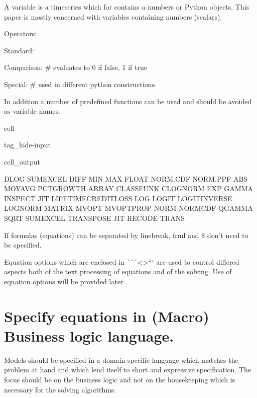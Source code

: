\documentclass[letterpaper,10pt,english]{jupyterBook}
\begin{document}
\sphinxAtStartPar
A variable is a timeseries which for contains a numbers or Python objects. This paper is mostly concerned with variables containing numbers (scalars).

\sphinxAtStartPar
Operators:

\sphinxAtStartPar
Standard: 

\sphinxAtStartPar
Comparison: \sphinxcode{\sphinxupquote{>= <= == !=}}  \# evaluates to 0 if false, 1 if true

\sphinxAtStartPar
Special:  \# used in different python constructions.

\sphinxAtStartPar
In addition a number of pre\sphinxhyphen{}defined functions can be used and should be avoided as variable names.

\begin{sphinxuseclass}{cell}
\begin{sphinxuseclass}{tag_hide-input}\begin{sphinxVerbatimOutput}

\begin{sphinxuseclass}{cell_output}
\begin{sphinxVerbatim}[commandchars=\\\{\}]
DLOG SUM\PYGZus{}EXCEL DIFF MIN MAX FLOAT NORM.CDF NORM.PPF ABS MOVAVG PCT\PYGZus{}GROWTH ARRAY CLASSFUNK CLOGNORM EXP GAMMA INSPECT JIT LIFETIME\PYGZus{}CREDIT\PYGZus{}LOSS LOG LOGIT LOGIT\PYGZus{}INVERSE LOGNORM MATRIX MV\PYGZus{}OPT MV\PYGZus{}OPT\PYGZus{}PROP NORM NORMCDF QGAMMA SQRT SUM\PYGZus{}EXCEL TRANSPOSE JIT RECODE TRANS
\end{sphinxVerbatim}

\end{sphinxuseclass}\end{sphinxVerbatimOutput}

\end{sphinxuseclass}
\end{sphinxuseclass}
\sphinxAtStartPar
If formulas (equations) can be separated by linebreak, frml and \$ don’t need to be specified.

\sphinxAtStartPar
Equation options  which are enclosed in ´´´<>``` are used to control differed aspects both of the text processing of equations and of the solving. Use of equation options will be provided later.


\section{Specify equations in (Macro) Business logic language.}
\label{\detokenize{content/notebooks/intro/model specification:specify-equations-in-macro-business-logic-language}}
\sphinxAtStartPar
Models should be specified in a domain specific language which matches the problem at hand and which lend itself to short and expressive specification. The focus should be on the business logic and not on the housekeeping which is necessary for the solving algorithms.
\end{document}
